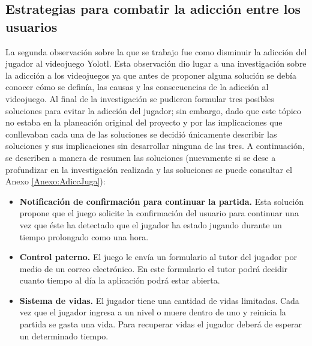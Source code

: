\subsection{Estrategias para combatir la adicción entre los usuarios}
La segunda observación sobre la que se trabajo fue como disminuir la adicción 
del jugador al videojuego Yolotl. Esta observación dio lugar a una investigación 
sobre la adicción a los videojuegos ya que antes de proponer alguna solución se 
debía conocer cómo se definía, las causas y las consecuencias de la adicción al 
videojuego. Al final de la investigación se pudieron formular tres posibles 
soluciones para evitar la adicción del jugador; sin embargo, dado que este tópico 
no estaba en la planeación original del proyecto y por las implicaciones que 
conllevaban cada una de las soluciones se decidió únicamente describir las 
soluciones y sus implicaciones sin desarrollar ninguna de las tres. A continuación, 
se describen a manera de resumen las soluciones (nuevamente si se dese a 
profundizar en la investigación realizada y las soluciones se puede consultar 
el Anexo \ref{Anexo:AdiccJuga}):
	\begin{itemize}
		\item \textbf{Notificación de confirmación para continuar la partida.} Esta 
		solución propone que el juego solicite la confirmación del usuario para 
		continuar una vez que éste ha detectado que el jugador ha estado jugando 
		durante un tiempo prolongado como una hora.
		\item \textbf{Control paterno.} El juego le envía un formulario al tutor del 
		jugador por medio de un correo electrónico. En este formulario el tutor podrá 
		decidir cuanto tiempo al día la aplicación podrá estar abierta. 
		\item \textbf{Sistema de vidas.} El jugador tiene una cantidad de vidas 
		limitadas. Cada vez que el jugador ingresa a un nivel o muere dentro de 
		uno y reinicia la partida se gasta una vida. Para recuperar vidas el 
		jugador deberá de esperar un determinado tiempo.
	\end{itemize}
	
%
%
%
%

